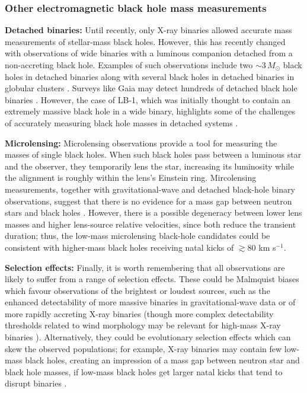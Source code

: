 \documentclass[review]{elsarticle}
\begin{document}
\subsubsection{Other electromagnetic black hole mass measurements} \label{sec:lensing}

\textbf{Detached binaries:} Until recently, only X-ray binaries allowed accurate mass measurements of stellar-mass black holes.  However, this has recently changed with observations of wide binaries with a luminous companion detached from a non-accreting black hole.  Examples of such observations include two $\sim 3\, M_\odot$ black holes in detached binaries \citep{Thompson:2019,Jayasinghe:2021} along with several black holes in detached binaries in globular clusters \citep{Giesers:2019,Saracino:2021}.  Surveys like Gaia may detect hundreds of detached black hole binaries \citep[e.g.,][]{Chawla:2021}.  However, the case of LB-1, which was initially thought to contain an extremely massive black hole in a wide binary, highlights some of the challenges of accurately measuring black hole masses in detached systems \citep{Liu:2019,Eldridge:2020,AbdulMassih:2020,Shenar:2020}.   

\textbf{Microlensing:} Microlensing observations provide a tool for measuring the masses of single black holes.  When such black holes pass between a luminous star and the observer, they temporarily lens the star, increasing its luminosity while the alignment is roughly within the lens's Einstein ring.  Mircolensing measurements, together with gravitational-wave and detached black-hole binary observations, suggest that there is no evidence for a mass gap between neutron stars and black holes \citep{WyrzykowskiMandel:2019, Mroz:2021}.  However, there is a possible degeneracy between lower lens masses and higher lens-source relative velocities, since both reduce the transient duration; thus, the low-mass microlensing black-hole candidates could be consistent with higher-mass black holes receiving natal kicks of $\gtrsim 80$ km s$^{-1}$.

\textbf{Selection effects:} Finally, it is worth remembering that all observations are likely to suffer from a range of selection effects.  These could be Malmquist biases which favour observations of the brightest or loudest sources, such as the enhanced detectability of more massive binaries in gravitational-wave data or of more rapidly accreting X-ray binaries (though more complex detectability thresholds related to wind morphology may be relevant for high-mass X-ray binaries \citep{HiraiMandel:2021}).  Alternatively, they could be evolutionary selection effects which can skew the observed populations; for example, X-ray binaries may contain few low-mass black holes, creating an impression of a mass gap between neutron star and black hole masses, if low-mass black holes get larger natal kicks that tend to disrupt binaries \citep{Mandel:2020}.
\end{document}
